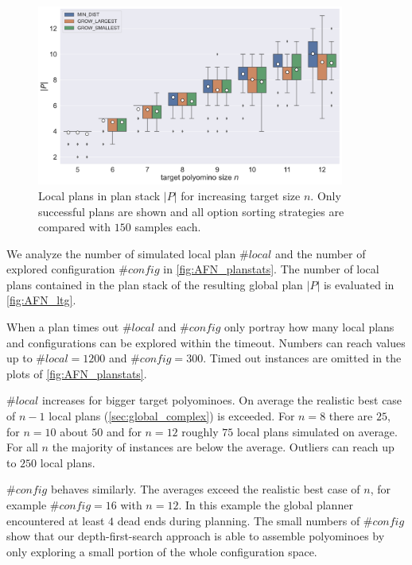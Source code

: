\begin{figure}
	\centering
	\includegraphics[width=0.9\textwidth]{figures/plots/AFN_ltg.pdf}
	\caption[Local plans in plan stack for increasing target size]{Local plans in plan stack $|P|$ for increasing target size $n$. Only successful plans are shown and all option sorting strategies are compared with $150$ samples each.}
	\label{fig:AFN_ltg}
\end{figure}


We analyze the number of simulated local plan $\#\textit{local}$ and the number of explored configuration $\#\textit{config}$ in \autoref{fig:AFN_planstats}.
The number of local plans contained in the plan stack of the resulting global plan $|P|$ is evaluated in \autoref{fig:AFN_ltg}.

When a plan times out $\#\textit{local}$ and $\#\textit{config}$ only portray how many local plans and configurations can be explored within the timeout.
Numbers can reach values up to $\#\textit{local} = 1200$ and $\#\textit{config} = 300$.
Timed out instances are omitted in the plots of \autoref{fig:AFN_planstats}.

$\#\textit{local}$ increases for bigger target polyominoes.
On average the realistic best case of $n-1$ local plans (\autoref{sec:global_complex}) is exceeded.
For $n=8$ there are $25$, for $n=10$ about $50$ and for $n=12$ roughly $75$ local plans simulated on average.
For all $n$ the majority of instances are below the average.
Outliers can reach up to $250$ local plans.

$\#\textit{config}$ behaves similarly.
The averages exceed the realistic best case of $n$, for example $\#\textit{config} = 16$ with $n=12$.
In this example the global planner encountered at least $4$ dead ends during planning.
The small numbers of $\#\textit{config}$ show that our depth-first-search approach is able to assemble polyominoes by only exploring a small portion of the whole configuration space.

